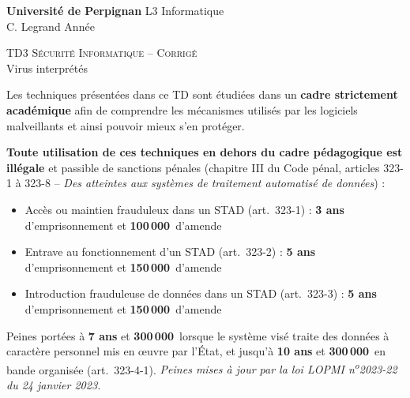 \documentclass[a4paper,11pt]{article}
\theoremstyle{plain}
\theoremstyle{definition}
\begin{document}
\hbox{}
\noindent \textbf{Université de Perpignan} \hfill  L3 Informatique \\
 \hfill C. Legrand \hfill  Année \the\year  \\
\smallskip
\begin{center}
{
 {\scshape \large TD3 Sécurité Informatique -- Corrigé}  \\
 Virus interprétés
}
\end{center}
\hbox{}

\bigskip

\begin{ethique}
Les techniques présentées dans ce TD sont étudiées dans un \textbf{cadre strictement académique} afin de comprendre les mécanismes utilisés par les logiciels malveillants et ainsi pouvoir mieux s'en protéger.

\textbf{Toute utilisation de ces techniques en dehors du cadre pédagogique est illégale} et passible de sanctions pénales (chapitre III du Code pénal, articles 323-1 à 323-8 -- \textit{Des atteintes aux systèmes de traitement automatisé de données}) :
\begin{itemize}
    \item Accès ou maintien frauduleux dans un STAD (art.~323-1) : \textbf{3 ans} d'emprisonnement et \textbf{100\,000\,\texteuro{}} d'amende
    \item Entrave au fonctionnement d'un STAD (art.~323-2) : \textbf{5 ans} d'emprisonnement et \textbf{150\,000\,\texteuro{}} d'amende
    \item Introduction frauduleuse de données dans un STAD (art.~323-3) : \textbf{5 ans} d'emprisonnement et \textbf{150\,000\,\texteuro{}} d'amende
\end{itemize}
Peines portées à \textbf{7 ans} et \textbf{300\,000\,\texteuro{}} lorsque le système visé traite des données à caractère personnel mis en \oe uvre par l'État, et jusqu'à \textbf{10 ans} et \textbf{300\,000\,\texteuro{}} en bande organisée (art.~323-4-1). \textit{Peines mises à jour par la loi LOPMI n\textsuperscript{o}2023-22 du 24 janvier 2023.}
\end{ethique}

\bigskip

\end{document}
